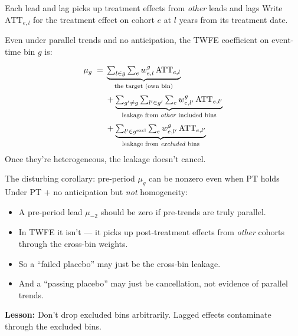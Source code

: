 \documentclass[aspectratio=169,11pt]{beamer}
\begin{document}
\begin{frame}{Each lead and lag picks up treatment effects from \textit{other} leads and lags}
\vspace{0.4em}
Write $\text{ATT}_{e,l}$ for the treatment effect on cohort $e$ at $l$ years from its treatment date.

\vspace{0.4em}
Even under parallel trends and no anticipation, the TWFE coefficient on event-time bin $g$ is:

\vspace{0.3em}
\begin{align*}
\mu_g \;=\; & \underbrace{\textstyle\sum_{l \in g} \sum_e w^g_{e,l}\, \text{ATT}_{e,l}}_{\text{the target (own bin)}} \\[0.2em]
            & + \underbrace{\textstyle\sum_{g' \neq g} \sum_{l' \in g'} \sum_e w^g_{e,l'}\, \text{ATT}_{e,l'}}_{\text{leakage from \textit{other} included bins}} \\[0.2em]
            & + \underbrace{\textstyle\sum_{l' \in g^{\text{excl}}} \sum_e w^g_{e,l'}\, \text{ATT}_{e,l'}}_{\text{leakage from \textit{excluded} bins}}
\end{align*}
\vspace{0.1em}
 \;Once they're heterogeneous, the leakage doesn't cancel.
\end{frame}

\begin{frame}{The disturbing corollary: pre-period $\mu_g$ can be nonzero even when PT holds}
\vspace{0.5em}
Under PT $+$ no anticipation but \textit{not} homogeneity:
\vspace{0.5em}
\begin{itemize}\small
  \item A pre-period lead $\mu_{-2}$ should be zero if pre-trends are truly parallel.
  \item In TWFE it isn't --- it picks up post-treatment effects from \textit{other} cohorts through the cross-bin weights.
  \item So a ``failed placebo'' may just be the cross-bin leakage.
  \item And a ``passing placebo'' may just be cancellation, not evidence of parallel trends.
\end{itemize}
\vspace{0.5em}
\textbf{Lesson:} \;Don't drop excluded bins arbitrarily. \;Lagged effects contaminate through the excluded bins.

\vspace{0.4em}
\end{frame}
\end{document}
